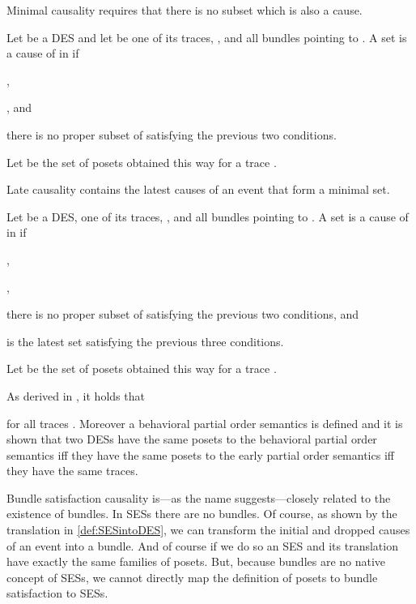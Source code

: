 \documentclass[runningheads,a4paper]{llncs}
\begin{document}
Minimal causality requires that there is no subset which is also a cause.

\begin{definition}
	Let  be a DES and let  be  one of its traces, , and  all bundles pointing to .
	A set  is a cause of  in  if
	\begin{compactitem}
		\item ,
		\item , and
		\item there is no proper subset of  satisfying the previous two conditions.	
	\end{compactitem}
	Let  be the set of posets obtained this way for a trace .
\end{definition}

Late causality contains the latest causes of an event that form a minimal set.

\begin{definition}
	Let  be a DES,  one of its traces, , and  all bundles pointing to .
	A set  is a cause of  in  if
	\begin{compactitem}
		\item ,
		\item ,
		\item there is no proper subset of  satisfying the previous two conditions, and
		\item  is the latest set satisfying the previous three conditions.	
	\end{compactitem}
	Let  be the set of posets obtained this way for a trace .
\end{definition}

As derived in \cite{Langerak97causalambiguity}, it holds that

for all traces .
Moreover a behavioral partial order semantics is defined and it is shown that two DESs have the same posets \wrt to the behavioral partial order semantics iff they have the same posets \wrt to the early partial order semantics iff they have the same traces.

Bundle satisfaction causality is---as the name suggests---closely related to the
existence of bundles. In SESs there are no bundles. Of course, as shown by the translation  in \ref{def:SESintoDES}, we can transform the initial and dropped causes of an event into a bundle. And of course if we do so an SES  and its translation  have exactly the same families of posets. But, because bundles are no native concept of SESs, we cannot directly map the definition of posets \wrt to bundle satisfaction to SESs.
\end{document}
